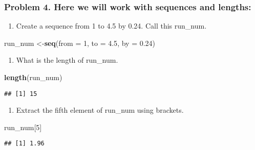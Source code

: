 \documentclass[]{article}
\newenvironment{Shaded}{\begin{snugshade}}{\end{snugshade}}
\newcommand{\DataTypeTok}[1]{\textcolor[rgb]{0.13,0.29,0.53}{#1}}
\newcommand{\DecValTok}[1]{\textcolor[rgb]{0.00,0.00,0.81}{#1}}
\newcommand{\FloatTok}[1]{\textcolor[rgb]{0.00,0.00,0.81}{#1}}
\newcommand{\KeywordTok}[1]{\textcolor[rgb]{0.13,0.29,0.53}{\textbf{#1}}}
\newcommand{\NormalTok}[1]{#1}
\providecommand{\tightlist}{%
  \setlength{\itemsep}{0pt}\setlength{\parskip}{0pt}}
\begin{document}
\hypertarget{problem-4.-here-we-will-work-with-sequences-and-lengths}{%
\subsubsection{Problem 4. Here we will work with sequences and
lengths:}\label{problem-4.-here-we-will-work-with-sequences-and-lengths}}

\begin{enumerate}
\def\labelenumi{\alph{enumi}.}
\tightlist
\item
  Create a sequence from 1 to 4.5 by 0.24. Call this run\_num.
\end{enumerate}

\begin{Shaded}
\begin{Highlighting}[]
\NormalTok{run_num <-}\KeywordTok{seq}\NormalTok{(}\DataTypeTok{from =} \DecValTok{1}\NormalTok{, }\DataTypeTok{to =} \FloatTok{4.5}\NormalTok{, }\DataTypeTok{by =} \FloatTok{0.24}\NormalTok{)}
\end{Highlighting}
\end{Shaded}

\begin{enumerate}
\def\labelenumi{\alph{enumi}.}
\setcounter{enumi}{1}
\tightlist
\item
  What is the length of run\_num.
\end{enumerate}

\begin{Shaded}
\begin{Highlighting}[]
\KeywordTok{length}\NormalTok{(run_num)}
\end{Highlighting}
\end{Shaded}

\begin{verbatim}
## [1] 15
\end{verbatim}

\begin{enumerate}
\def\labelenumi{\alph{enumi}.}
\setcounter{enumi}{2}
\tightlist
\item
  Extract the fifth element of run\_num using brackets.
\end{enumerate}

\begin{Shaded}
\begin{Highlighting}[]
\NormalTok{run_num[}\DecValTok{5}\NormalTok{]}
\end{Highlighting}
\end{Shaded}

\begin{verbatim}
## [1] 1.96
\end{verbatim}
\end{document}
